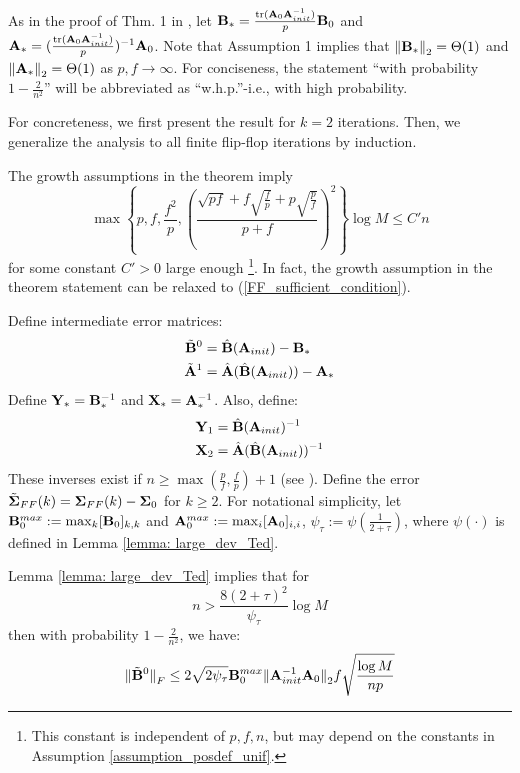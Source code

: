 \begin{IEEEproof}
As in the proof of Thm. 1 in \cite{EstCovMatKron}, let ${\mathbf{B}}_* = \frac{{ \text{tr} }({\mathbf{A}}_0{\mathbf{A}}_{init}^{-1})}{p} {\mathbf{B}}_0$ and ${\mathbf{A}}_* = (\frac{{ \text{tr} }({\mathbf{A}}_0{\mathbf{A}}_{init}^{-1})}{p})^{-1} {\mathbf{A}}_0$. Note that Assumption 1 implies that ${ \parallel } {\mathbf{B}}_* { \parallel }_2 = \Theta(1)$ and ${ \parallel } {\mathbf{A}}_* { \parallel }_2=\Theta(1)$ as $p,f\to\infty$. For conciseness, the statement ``with probability $1-\frac{2}{n^2}$'' will be abbreviated as ``w.h.p.''-i.e., with high probability.

For concreteness, we first present the result for $k=2$ iterations. Then, we generalize the analysis to all finite flip-flop iterations by induction.

The growth assumptions in the theorem imply
\begin{equation} \label{FF_sufficient_condition}
	\max \left\{p,f, \frac{f^2}{p}, \left(\frac{\sqrt{pf} + f\sqrt{\frac{f}{p}} + p \sqrt{\frac{p}{f}}}{p+f}\right)^2 \right\} \log M \leq C'n
\end{equation}
for some constant $C'>0$ large enough \footnote{This constant is independent of $p,f,n$, but may depend on the constants in Assumption \ref{assumption_posdef_unif}.}. In fact, the growth assumption in the theorem statement can be relaxed to (\ref{FF_sufficient_condition}).

Define intermediate error matrices:
\begin{align*}
	\tilde{{\mathbf{B}}}^0 &= \hat{{\mathbf{B}}}({\mathbf{A}}_{init}) - {\mathbf{B}}_* \\
	\tilde{{\mathbf{A}}}^1 &= \hat{{\mathbf{A}}}(\hat{{\mathbf{B}}}({\mathbf{A}}_{init})) - {\mathbf{A}}_*
\end{align*}
Define ${\mathbf{Y}}_*={\mathbf{B}}_*^{-1}$ and ${\mathbf{X}}_*={\mathbf{A}}_*^{-1}$. Also, define:
\begin{align*}
	{\mathbf{Y}}_1 &= \hat{{\mathbf{B}}}({\mathbf{A}}_{init})^{-1} \\
	{\mathbf{X}}_2 &= \hat{{\mathbf{A}}}(\hat{{\mathbf{B}}}({\mathbf{A}}_{init}))^{-1}
\end{align*}
These inverses exist if $n\geq \max(\frac{p}{f},\frac{f}{p}) + 1$ (see \cite{LuZimmerman}). Define the error $\tilde{{\mathbf{\Sigma}}}_{FF}(k)={\mathbf{\Sigma}}_{FF}(k) - {\mathbf{\Sigma}}_0$ for $k \geq 2$. For notational simplicity, let ${\mathbf{B}}_0^{max}:=\max_{k}[{\mathbf{B}}_0]_{k,k}$ and ${\mathbf{A}}_0^{max}:=\max_{i}[{\mathbf{A}}_0]_{i,i}$, $\psi_{\tau} := \psi(\frac{1}{2+\tau})$, where $\psi(\cdot)$ is defined in Lemma \ref{lemma: large_dev_Ted}.

Lemma \ref{lemma: large_dev_Ted} implies that for
\begin{equation} \label{cond_0}
	n> \frac{8(2+\tau)^2}{\psi_{\tau}} \log M
\end{equation}
then with probability $1-\frac{2}{n^2}$, we have:
\begin{equation} \label{B_0_Frob1}
	{ \parallel } \tilde{{\mathbf{B}}}^0 { \parallel }_F \leq 2\sqrt{2\psi_\tau} {\mathbf{B}}_0^{max} { \parallel }{\mathbf{A}}_{init}^{-1} {\mathbf{A}}_0{ \parallel }_2  f \sqrt{ \frac{\log M}{np}}
\end{equation}


\end{IEEEproof}
